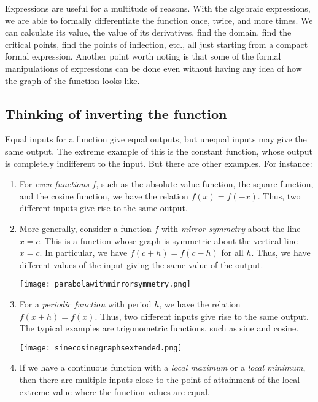 \documentclass[10pt]{amsart}
\begin{document}
Expressions are useful for a multitude of reasons. With the algebraic
expressions, we are able to formally differentiate the function once,
twice, and more times. We can calculate its value, the value of its
derivatives, find the domain, find the critical points, find the
points of inflection, etc., all just starting from a compact formal
expression. Another point worth noting is that some of the formal
manipulations of expressions can be done even without having any idea
of how the graph of the function looks like.

\subsection{Thinking of inverting the function}

Equal inputs for a function give equal outputs, but unequal inputs may
give the same output. The extreme example of this is the constant
function, whose output is completely indifferent to the input. But
there are other examples. For instance:

\begin{enumerate}
\item For {\em even functions} $f$, such as the absolute value
  function, the square function, and the cosine function, we have the
  relation $f(x) = f(-x)$. Thus, two different inputs give rise to the
  same output.
\item More generally, consider a function $f$ with {\em mirror
  symmetry} about the line $x = c$. This is a function whose graph is
  symmetric about the vertical line $x = c$. In particular, we have
  $f(c + h) = f(c - h)$ for all $h$. Thus, we have different values of
  the input giving the same value of the output.

  \texttt{[image: parabolawithmirrorsymmetry.png]}

\item For a {\em periodic function} with period $h$, we have the
  relation $f(x + h) = f(x)$. Thus, two different inputs give rise to
  the same output. The typical examples are trigonometric functions,
  such as sine and cosine.

  \texttt{[image: sinecosinegraphsextended.png]}

\item If we have a continuous function with a {\em local maximum} or a
  {\em local minimum}, then there are multiple inputs close to the
  point of attainment of the local extreme value where the function
  values are equal.
\end{enumerate}
\end{document}
